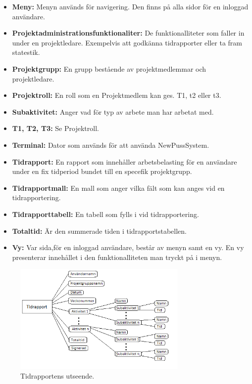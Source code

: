 \documentclass[a4paper]{article}
\begin{document}
\begin{itemize}
\item [] \textbf{Meny:} Menyn används för navigering. Den finns på alla sidor för en inloggad användare.
\item [] \textbf{Projektadministrationsfunktionaliter:} De funktionalliteter som faller in under en projektledare. Exempelvis att godkänna tidrapporter eller ta fram statestik.
\item [] \textbf{Projektgrupp:} En grupp bestående av projektmedlemmar och projektledare.
\item [] \textbf{Projektroll:} En roll som en Projektmedlem kan ges. T1, t2 eller t3.
\item [] \textbf{Subaktivitet:} Anger vad för typ av arbete man har arbetat med.
\item [] \textbf{T1, T2, T3:} Se Projektroll.
\item [] \textbf{Terminal:} Dator som används för att använda NewPussSystem.
\item [] \textbf{Tidrapport:} En rapport som innehåller arbetsbelasting för en användare under en fix tidperiod bundet till en specefik projektgrupp.
\item [] \textbf{Tidrapportmall:} En mall som anger vilka fält som kan anges vid en tidrapportering.
\item [] \textbf{Tidrapporttabell:} En tabell som fylls i vid tidrapportering. 
\item [] \textbf{Totaltid:} Är den summerade tiden i tidrapportstabellen. 
\item [] \textbf{Vy:} Var sida,för en inloggad användare, består av menyn samt en vy. En vy presenterar innehållet i den funktionalliteten man tryckt på i menyn.
\end{itemize}
			\begin{figure}[h!]
				\centering
				\includegraphics[width=0.75\textwidth]{Tidrapport_Modell}
				\caption{Tidrapportens utseende.}
				\label{image_gen_tidrapport}
			\end{figure}
\end{document}
